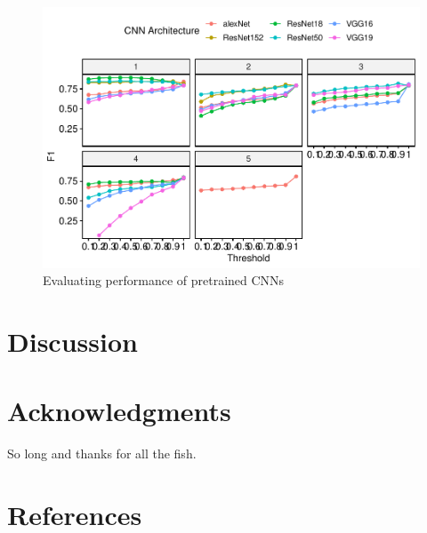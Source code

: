 \documentclass{article}
\begin{document}
\begin{figure}[H]

\includegraphics{gibbonNetRMSarxiv_files/figure-latex/unnamed-chunk-3-1} \hfill{}

\caption{Evaluating performance of pretrained CNNs}\label{fig:unnamed-chunk-3}
\end{figure}

\hypertarget{discussion}{%
\section{Discussion}\label{discussion}}

\hypertarget{acknowledgments}{%
\section{Acknowledgments}\label{acknowledgments}}

So long and thanks for all the fish.

\hypertarget{references}{%
\section*{References}\label{references}}
\end{document}
